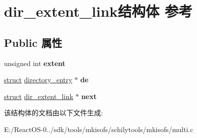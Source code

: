 \hypertarget{structdir__extent__link}{}\section{dir\+\_\+extent\+\_\+link结构体 参考}
\label{structdir__extent__link}
\subsection*{Public 属性}
\begin{DoxyCompactItemize}
\item 
\mbox{\label{structdir__extent__link_a6cccf7ade9957f5c4427bd1f1ffbead3}} 
unsigned int {\bfseries extent}
\item 
\mbox{\label{structdir__extent__link_a47895aeff1e0d63aeaaf5d3f525bcf91}} 
\hyperlink{interfacestruct}{struct} \hyperlink{structdirectory__entry}{directory\+\_\+entry} $\ast$ {\bfseries de}
\item 
\mbox{\label{structdir__extent__link_ace5c4d691d785af9a631f654d7ed62ca}} 
\hyperlink{interfacestruct}{struct} \hyperlink{structdir__extent__link}{dir\+\_\+extent\+\_\+link} $\ast$ {\bfseries next}
\end{DoxyCompactItemize}


该结构体的文档由以下文件生成\+:\begin{DoxyCompactItemize}
\item 
E\+:/\+React\+O\+S-\/0../sdk/tools/mkisofs/schilytools/mkisofs/multi.\+c\end{DoxyCompactItemize}
